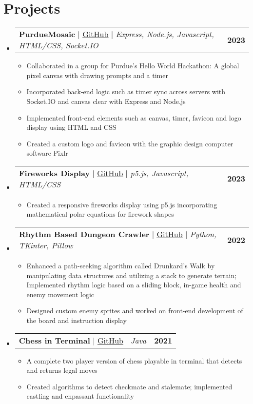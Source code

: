 \documentclass[letterpaper,11pt]{article}
\makeatletter
\newcommand{\resumeItem}[1]{
  \item\small{
    {#1 \vspace{-2pt}}
  }
}
\newcommand{\resumeProjectHeading}[2]{
    \item
    \begin{tabular*}{1.001\textwidth}{l@{\extracolsep{\fill}}r}
      \small#1 & \textbf{\small #2}\\
    \end{tabular*}\vspace{-7pt}
}
\newcommand{\resumeSubHeadingListStart}{\begin{itemize}[leftmargin=0.0in, label={}]}
\newcommand{\resumeSubHeadingListEnd}{\end{itemize}}
\newcommand{\resumeItemListStart}{\begin{itemize}}
\newcommand{\resumeItemListEnd}{\end{itemize}\vspace{-5pt}}
\makeatother
\begin{document}
\section{Projects}
    \vspace{-5pt}
    \resumeSubHeadingListStart
      \resumeProjectHeading
          {\textbf{PurdueMosaic} $|$ \href{https://github.com/inner-LMNt/PurdueMosaic}{\underline{GitHub}} $|$ \emph{Express, Node.js, Javascript, HTML/CSS, Socket.IO}}{2023}
          \resumeItemListStart
            \resumeItem{Collaborated in a group for Purdue's Hello World Hackathon: A global pixel canvas with drawing prompts and a timer}
            \resumeItem{Incorporated back-end logic such as timer sync across servers with Socket.IO and canvas clear with Express and Node.js}
            \resumeItem{Implemented front-end elements such as canvas, timer, favicon and logo display using HTML and CSS}
            \resumeItem{Created a custom logo and favicon with the graphic design computer software Pixlr}
          \resumeItemListEnd
          \vspace{-13pt}
      \resumeProjectHeading
          {\textbf{Fireworks Display} $|$ \href{https://github.com/alex2tu/fireworks-display}{\underline{GitHub}} $|$ \emph{p5.js, Javascript, HTML/CSS}}{2023}
          \resumeItemListStart
            \resumeItem{Created a responsive fireworks display using p5.js incorporating mathematical polar equations for firework shapes}
          \resumeItemListEnd 
          \vspace{-13pt}
      \resumeProjectHeading
          {\textbf{Rhythm Based Dungeon Crawler} $|$ \href{https://github.com/alex2tu/crypt-of-necrodancer}{\underline{GitHub}} $|$ \emph{Python, TKinter, Pillow}}{2022}
          \resumeItemListStart
            \resumeItem{Enhanced a path-seeking algorithm called Drunkard's Walk by manipulating data structures and utilizing a stack to generate terrain; Implemented rhythm logic based on a sliding block, in-game health and enemy movement logic}
            \resumeItem{Designed custom enemy sprites and worked on front-end development of the board and instruction display}
          \resumeItemListEnd 
          \vspace{-13pt}
      \resumeProjectHeading
          {\textbf{Chess in Terminal} $|$ \href{https://github.com/alex2tu/chess-in-terminal}{\underline{GitHub}} $|$ \emph{Java}}{2021}
          \resumeItemListStart
            \resumeItem{A complete two player version of chess playable in terminal that detects and returns legal moves}
            \resumeItem{Created algorithms to detect checkmate and stalemate; implemented castling and enpassant functionality}
          \resumeItemListEnd 
    \resumeSubHeadingListEnd
\vspace{-15pt}
\end{document}
